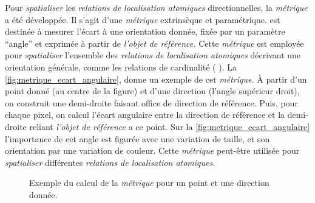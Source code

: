 Pour \emph{spatialiser} les \emph{relations de localisation atomiques}
directionnelles, la \emph{métrique}  a été
développée. Il s'agit d'une \emph{métrique} extrinsèque et
paramétrique.  est destinée à mesurer l'écart à
une orientation donnée, fixée par un paramètre \enquote{angle} et
exprimée à partir de \emph{l'objet de référence.} Cette
\emph{métrique} est employée pour \emph{spatialiser} l'ensemble des
\emph{relations de localisation atomiques} décrivant une orientation
générale, comme les relations de cardinalité (\eg
{}). La \autoref{fig:metrique_ecart_angulaire},
donne un exemple de cet \emph{métrique.} À partir d'un point donné (au
centre de la figure) et d'une direction (l'angle supérieur droit), on
construit une demi-droite faisant office de direction de
référence. Puis, pour chaque pixel, on calcul l'écart angulaire entre
la direction de référence et la demi-droite reliant \emph{l'objet de
  référence} a ce point. Sur la \autoref{fig:metrique_ecart_angulaire}
l'importance de cet angle est figurée avec une variation de taille, et
son orientation par une variation de couleur. Cette \emph{métrique}
peut-être utilisée pour \emph{spatialiser} différentes \emph{relations
  de localisation atomiques.}

\begin{figure}
  \centering
  
  \caption{Exemple du calcul de la \emph{métrique}
    \protect{} pour un point et une direction
    donnée.}
  \label{fig:metrique_ecart_angulaire}
\end{figure}

